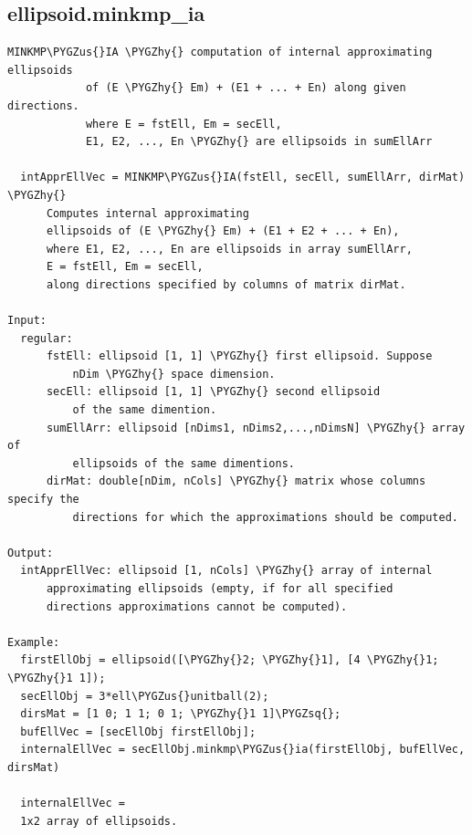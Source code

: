 \documentclass[letterpaper,10pt,english]{sphinxmanual}
\def\PYGZus{\char`\_}
\def\PYGZhy{\char`\-}
\def\PYGZsq{\char`\'}
\begin{document}
\subsection{ellipsoid.minkmp\_ia}
\label{chap_functions:ellipsoid-minkmp-ia}
\begin{Verbatim}[commandchars=\\\{\}]
MINKMP\PYGZus{}IA \PYGZhy{} computation of internal approximating ellipsoids
            of (E \PYGZhy{} Em) + (E1 + ... + En) along given directions.
            where E = fstEll, Em = secEll,
            E1, E2, ..., En \PYGZhy{} are ellipsoids in sumEllArr

  intApprEllVec = MINKMP\PYGZus{}IA(fstEll, secEll, sumEllArr, dirMat) \PYGZhy{}
      Computes internal approximating
      ellipsoids of (E \PYGZhy{} Em) + (E1 + E2 + ... + En),
      where E1, E2, ..., En are ellipsoids in array sumEllArr,
      E = fstEll, Em = secEll,
      along directions specified by columns of matrix dirMat.

Input:
  regular:
      fstEll: ellipsoid [1, 1] \PYGZhy{} first ellipsoid. Suppose
          nDim \PYGZhy{} space dimension.
      secEll: ellipsoid [1, 1] \PYGZhy{} second ellipsoid
          of the same dimention.
      sumEllArr: ellipsoid [nDims1, nDims2,...,nDimsN] \PYGZhy{} array of
          ellipsoids of the same dimentions.
      dirMat: double[nDim, nCols] \PYGZhy{} matrix whose columns specify the
          directions for which the approximations should be computed.

Output:
  intApprEllVec: ellipsoid [1, nCols] \PYGZhy{} array of internal
      approximating ellipsoids (empty, if for all specified
      directions approximations cannot be computed).

Example:
  firstEllObj = ellipsoid([\PYGZhy{}2; \PYGZhy{}1], [4 \PYGZhy{}1; \PYGZhy{}1 1]);
  secEllObj = 3*ell\PYGZus{}unitball(2);
  dirsMat = [1 0; 1 1; 0 1; \PYGZhy{}1 1]\PYGZsq{};
  bufEllVec = [secEllObj firstEllObj];
  internalEllVec = secEllObj.minkmp\PYGZus{}ia(firstEllObj, bufEllVec, dirsMat)

  internalEllVec =
  1x2 array of ellipsoids.
\end{Verbatim}
\end{document}
